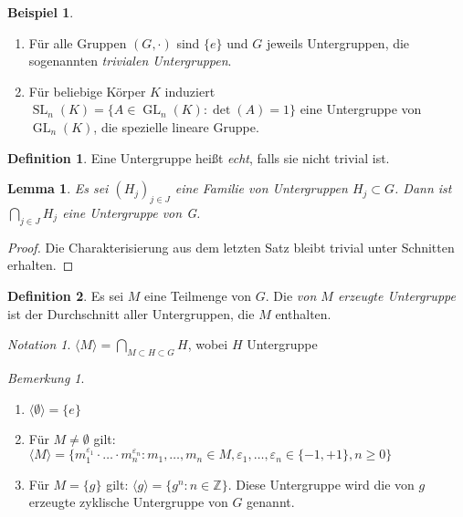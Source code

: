 \documentclass[12pt]{scrartcl} %
\DeclareMathOperator{\GL}{GL}
\DeclareMathOperator{\SL}{SL}
\newtheorem{lemma}{Lemma}
\theoremstyle{definition}
\newtheorem*{defn}{Definition}
\newtheorem{ex}{Beispiel}
\theoremstyle{remark}
\newtheorem*{notation}{Notation}
\newtheorem*{nb}{Bemerkung}
\begin{document}
\begin{ex}
	\begin{enumerate}[label=(\alph*)]
	\item Für alle Gruppen $(G,\cdot)$ sind $\{e\}$ und $G$ jeweils Untergruppen, die sogenannten \emph{trivialen Untergruppen}.
	\item Für beliebige Körper $K$ induziert $\SL_n(K)=\{A\in \GL_n(K): \det(A)=1\}$ eine Untergruppe von $\GL_n(K)$, die spezielle lineare Gruppe.
	\end{enumerate}
\end{ex}

\begin{defn}
	Eine Untergruppe heißt \emph{echt}, falls sie nicht trivial ist.
\end{defn}

\begin{lemma}
	Es sei $(H_{j})_{j \in J}$ eine Familie von Untergruppen $H_{j} \subset G$.
	Dann ist $\bigcap_{j \in J}H_{j}$ eine Untergruppe von G.
\end{lemma}

\begin{proof}
	Die Charakterisierung aus dem letzten Satz bleibt trivial unter Schnitten erhalten.
\end{proof}

\begin{defn}
	Es sei $M$ eine Teilmenge von $G$.
	Die \emph{von $M$ erzeugte Untergruppe} ist der Durchschnitt aller Untergruppen, die $M$ enthalten.
\end{defn}

\begin{notation}
	$\langle M \rangle =\bigcap_{M \subset H \subset G}H$, wobei $H$ Untergruppe
\end{notation}

\begin{nb}
	\begin{enumerate}[label=(\alph*)]
	\item $\langle \emptyset \rangle = \lbrace e \rbrace$
	\item Für $M \neq \emptyset$ gilt: $\langle M \rangle = \lbrace m_{1}^{\varepsilon_{1}} \cdot \dots \cdot m_{n}^{\varepsilon_{n}} : m_{1},\dots,m_{n} \in M, \varepsilon_{1},\dots,\varepsilon_{n} \in \lbrace -1,+1\rbrace, n \geq 0 \rbrace$
	\item Für $M = \lbrace g \rbrace$ gilt: $\langle g \rangle = \lbrace g^{n} : n \in \mathbb{Z} \rbrace$. Diese Untergruppe wird die von $g$ erzeugte zyklische Untergruppe von $G$ genannt.
	\end{enumerate}
\end{nb}
\end{document}
